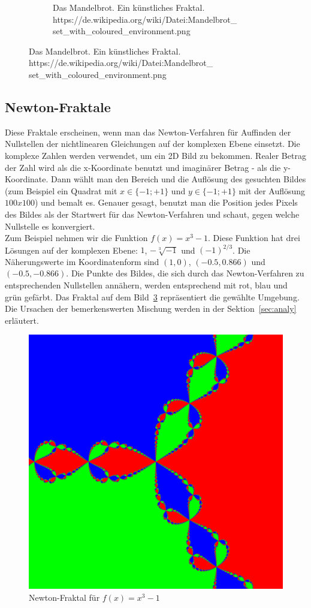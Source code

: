 \documentclass[a4paper,12pt]{llncs}
\numberwithin{equation}{section}
\begin{document}
\begin{figure}[ht]
\begin{subfigure}{.5\textwidth}
		\caption{Das Mandelbrot. Ein künstliches Fraktal.\\\tiny{https://de.wikipedia.org/wiki/Datei:Mandelbrot\_\\set\_with\_coloured\_environment.png}}
		\label{fig:frac_math}
	\end{subfigure}%
\end{figure}

\subsection{Newton-Fraktale}
Diese Fraktale erscheinen, wenn man das Newton-Verfahren für Auffinden der Nullstellen der nichtlinearen Gleichungen auf der komplexen Ebene einsetzt. 
Die komplexe Zahlen werden verwendet, um ein 2D Bild zu bekommen.
Realer Betrag der Zahl wird als die x-Koordinate benutzt und imaginärer Betrag - als die y-Koordinate.
Dann wählt man den Bereich und die Auflösung des gesuchten Bildes (zum Beispiel ein Quadrat mit $x\in\{-1;+1\}$ und $y\in\{-1;+1\}$ mit der Auflösung $100x100$) und bemalt es.
Genauer gesagt, benutzt man die Position jedes Pixels des Bildes als der Startwert für das Newton-Verfahren und schaut, gegen welche Nullstelle es konvergiert.\\
Zum Beispiel nehmen wir die Funktion $f(x) = x^3 -1$. 
Diese Funktion hat drei Lösungen auf der komplexen Ebene: $1$, $-\sqrt[3]{-1}$ und $(-1)^{2/3}$. 
Die Näherungswerte im Koordinatenform sind $(1, 0)$, $(-0.5, 0.866)$ und $(-0.5, -0.866)$. 
Die Punkte des Bildes, die sich durch das Newton-Verfahren zu entsprechenden Nullstellen annähern, werden entsprechend mit rot, blau und grün gefärbt.
Das Fraktal auf dem Bild~\ref{fig:output3_0} repräsentiert die gewählte Umgebung.
Die Ursachen der bemerkenswerten Mischung werden in der Sektion~\ref{sec:analy} erläutert.
\begin{figure}[ht]   
	\centering
	\includegraphics[width=.5\linewidth]{figures/output3_0}
	\caption{Newton-Fraktal für $f(x)=x^3-1$ }
	\label{fig:output3_0}
\end{figure}
\end{document}

